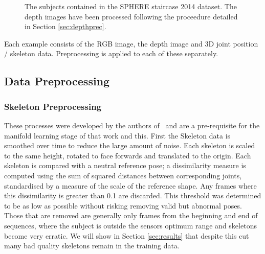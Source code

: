 \documentclass[11pt]{article} %
\begin{document}
\begin{figure}
\qquad
{}%
\qquad
{}%
\caption{The subjects contained in the SPHERE staircase 2014 dataset. The depth images have been processed following the proceedure detailed in Section \ref{sec:depthprec}. }
\label{fig:subjects}
\end{figure}

Each example consists of the RGB image, the depth image and 3D joint position / skeleton data. Preprocessing is applied to each of these separately.

\subsection{Data Preprocessing}

\subsubsection{Skeleton Preprocessing}
\label{sec:skelPreproc}

These processes were developed by the authors of~\cite{Paiement} and are a pre-requisite for the manifold learning stage of that work and this. First the Skeleton data is smoothed over time to reduce the large amount of noise. Each skeleton is scaled to the same height, rotated to face forwards and translated to the origin. Each skeleton is compared with a neutral reference pose;  a dissimilarity measure is computed  using the sum of squared distances between corresponding joints, standardised by a measure of the scale of the reference shape. Any frames where this dissimilarity is greater than 0.1 are discarded. This threshold was determined to be as low as possible without risking removing valid but abnormal poses. Those that are removed are generally only frames from the beginning and end of sequences, where the subject is outside the sensors optimum range and skeletons become very erratic. We will show in Section \ref{sec:results} that despite this cut many bad quality skeletons remain in the training data.
\end{document}
